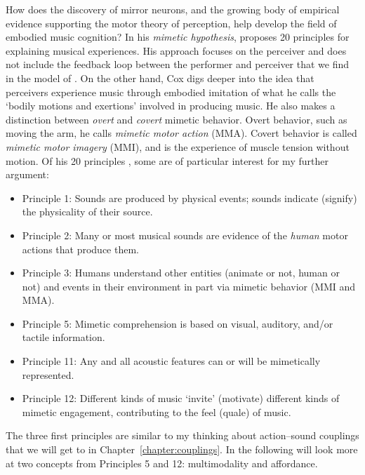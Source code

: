 How does the discovery of mirror neurons, and the growing body of empirical evidence supporting the motor theory of perception, help develop the field of embodied music cognition? In his \emph{mimetic hypothesis}, \citet{cox_music_2016} proposes 20 principles for explaining musical experiences. His approach focuses on the perceiver and does not include the feedback loop between the performer and perceiver that we find in the model of \citet{leman_embodied_2008}. On the other hand, Cox digs deeper into the idea that perceivers experience music through embodied imitation of what he calls the `bodily motions and exertions' involved in producing music.
He also makes a distinction between \emph{overt} and \emph{covert} mimetic behavior. Overt behavior, such as moving the arm, he calls \emph{mimetic motor action} (MMA). Covert behavior is called \emph{mimetic motor imagery} (MMI), and is the experience of muscle tension without motion. Of his 20 principles \citep[p.13]{cox_music_2016}, some are of particular interest for my further argument:

\begin{itemize}

\item Principle 1: Sounds are produced by physical events; sounds indicate (signify) the physicality of their source.

\item Principle 2: Many or most musical sounds are evidence of the \emph{human} motor actions that produce them.

\item Principle 3: Humans understand other entities (animate or not, human or not) and events in their environment in part via mimetic behavior (MMI and MMA).

\item Principle 5: Mimetic comprehension is based on visual, auditory, and/or tactile information.

\item Principle 11: Any and all acoustic features can or will be mimetically represented.

\item Principle 12: Different kinds of music `invite' (motivate) different kinds of mimetic engagement, contributing to the feel (quale) of music.
\end{itemize}

The three first principles are similar to my thinking about action--sound couplings that we will get to in Chapter~\ref{chapter:couplings}. In the following will look more at two concepts from Principles 5 and 12: multimodality and affordance.


